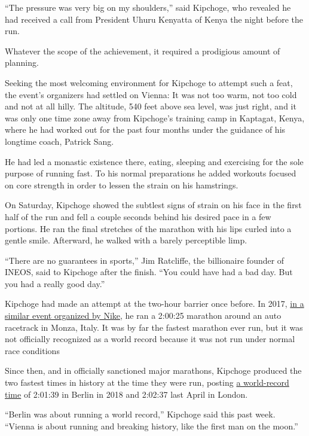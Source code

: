 ``The pressure was very big on my shoulders,'' said Kipchoge, who
revealed he had received a call from President Uhuru Kenyatta of Kenya
the night before the run.

Whatever the scope of the achievement, it required a prodigious amount
of planning.

Seeking the most welcoming environment for Kipchoge to attempt such a
feat, the event's organizers had settled on Vienna: It was not too warm,
not too cold and not at all hilly. The altitude, 540 feet above sea
level, was just right, and it was only one time zone away from
Kipchoge's training camp in Kaptagat, Kenya, where he had worked out for
the past four months under the guidance of his longtime coach, Patrick
Sang.

He had led a monastic existence there, eating, sleeping and exercising
for the sole purpose of running fast. To his normal preparations he
added workouts focused on core strength in order to lessen the strain on
his hamstrings.

On Saturday, Kipchoge showed the subtlest signs of strain on his face in
the first half of the run and fell a couple seconds behind his desired
pace in a few portions. He ran the final stretches of the marathon with
his lips curled into a gentle smile. Afterward, he walked with a barely
perceptible limp.

``There are no guarantees in sports,'' Jim Ratcliffe, the billionaire
founder of INEOS, said to Kipchoge after the finish. ``You could have
had a bad day. But you had a really good day.''

Kipchoge had made an attempt at the two-hour barrier once before. In
2017,
\href{https://www.nytimes3xbfgragh.onion/2017/05/06/sports/eliud-kipchoge-marathon-nike-shoes.html?searchResultPosition=6}{in
a similar event organized by Nike}, he ran a 2:00:25 marathon around an
auto racetrack in Monza, Italy. It was by far the fastest marathon ever
run, but it was not officially recognized as a world record because it
was not run under normal race conditions

Since then, and in officially sanctioned major marathons, Kipchoge
produced the two fastest times in history at the time they were run,
posting
\href{https://www.nytimes3xbfgragh.onion/2018/09/16/sports/eliud-kipchoge-marathon-record.html}{a
world-record time} of 2:01:39 in Berlin in 2018 and 2:02:37 last April
in London.

``Berlin was about running a world record,'' Kipchoge said this past
week. ``Vienna is about running and breaking history, like the first man
on the moon.''

